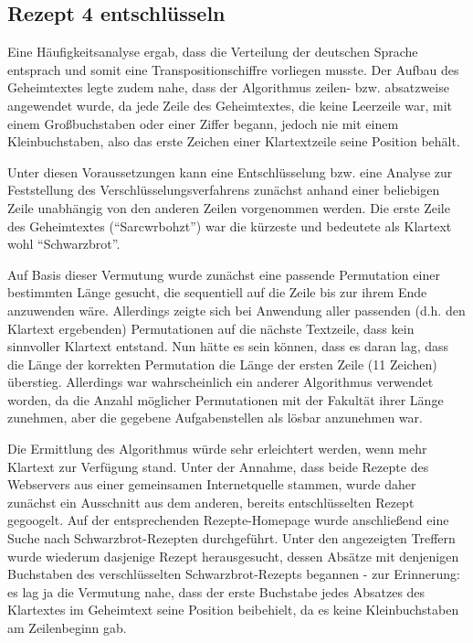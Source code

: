 \subsection{Rezept 4 entschlüsseln}
\label{RezeptVierEntschluesseln}

Eine Häufigkeitsanalyse ergab, dass die Verteilung der deutschen Sprache
entsprach und somit eine Transpositionschiffre vorliegen musste. Der Aufbau des
Geheimtextes legte zudem nahe, dass der Algorithmus zeilen- bzw. absatzweise
angewendet wurde, da jede Zeile des Geheimtextes, die keine Leerzeile war, mit
einem Großbuchstaben oder einer Ziffer begann, jedoch nie mit einem
Kleinbuchstaben, also das erste Zeichen einer Klartextzeile seine Position
behält.

Unter diesen Voraussetzungen kann eine Entschlüsselung bzw. eine Analyse zur
Feststellung des Verschlüsselungsverfahrens zunächst anhand einer beliebigen
Zeile unabhängig von den anderen Zeilen vorgenommen werden. Die erste Zeile des
Geheimtextes (``Sarcwrbohzt'') war die kürzeste und bedeutete als Klartext wohl
``Schwarzbrot''.

Auf Basis dieser Vermutung wurde zunächst eine passende Permutation einer
bestimmten Länge gesucht, die sequentiell auf die Zeile bis zur ihrem Ende
anzuwenden wäre. Allerdings zeigte sich bei Anwendung aller passenden (d.h. den
Klartext ergebenden) Permutationen auf die nächste Textzeile, dass kein
sinnvoller Klartext entstand. Nun hätte es sein können, dass es daran lag, dass
die Länge der korrekten Permutation die Länge der ersten Zeile (11 Zeichen)
überstieg. Allerdings war wahrscheinlich ein anderer Algorithmus verwendet
worden, da die Anzahl möglicher Permutationen mit der Fakultät ihrer Länge
zunehmen, aber die gegebene Aufgabenstellen als lösbar anzunehmen war.

Die Ermittlung des Algorithmus würde sehr erleichtert werden, wenn mehr Klartext
zur Verfügung stand. Unter der Annahme, dass beide Rezepte des Webservers aus
einer gemeinsamen Internetquelle stammen, wurde daher zunächst ein Ausschnitt
aus dem anderen, bereits entschlüsselten Rezept gegoogelt. Auf der
entsprechenden Rezepte-Homepage wurde anschließend eine Suche nach
Schwarzbrot-Rezepten durchgeführt. Unter den angezeigten Treffern wurde wiederum
dasjenige Rezept herausgesucht, dessen Absätze mit denjenigen Buchstaben des
verschlüsselten Schwarzbrot-Rezepts begannen - zur Erinnerung: es lag ja die
Vermutung nahe, dass der erste Buchstabe jedes Absatzes des Klartextes im
Geheimtext seine Position beibehielt, da es keine Kleinbuchstaben am
Zeilenbeginn gab.

